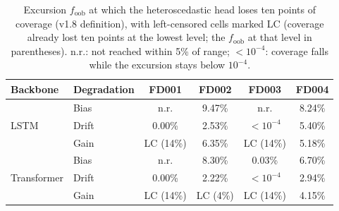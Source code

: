 \documentclass[10pt,a4paper]{article}
\begin{document}
\begin{table}[H]\centering\scriptsize
\caption{Excursion $f_{\mathrm{oob}}$ at which the heteroscedastic head loses ten points of coverage (v1.8 definition), with left-censored cells marked LC (coverage already lost ten points at the lowest level; the $f_{\mathrm{oob}}$ at that level in parentheses). n.r.: not reached within 5\% of range; $<10^{-4}$: coverage falls while the excursion stays below $10^{-4}$.}
\begin{tabular}{llcccc}\toprule
Backbone & Degradation & FD001 & FD002 & FD003 & FD004 \\ \midrule
\multirow{3}{*}{LSTM} & Bias & n.r. & 9.47\% & n.r. & 8.24\% \\
 & Drift & 0.00\% & 2.53\% & $<10^{-4}$ & 5.40\% \\
 & Gain & LC (14\%) & 6.35\% & LC (14\%) & 5.18\% \\
\midrule
\multirow{3}{*}{Transformer} & Bias & n.r. & 8.30\% & 0.03\% & 6.70\% \\
 & Drift & 0.00\% & 2.22\% & $<10^{-4}$ & 2.94\% \\
 & Gain & LC (14\%) & LC (4\%) & LC (14\%) & 4.15\% \\
\bottomrule\end{tabular}
\end{table}

\FloatBarrier
\end{document}
